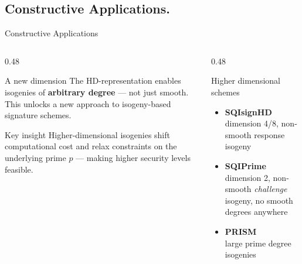 \documentclass[aspectratio=169,notheorems]{beamer}
\begin{document}
	\subsection{Constructive  Applications.}
		\begin{frame}{Constructive Applications}
		\begin{columns}[T]
			\begin{column}{0.48\textwidth}
				\begin{block}{A new dimension}
					The HD-representation enables isogenies
					of \textbf{arbitrary degree} — not just smooth.
					This unlocks a new approach to
					isogeny-based signature schemes.
				\end{block}
				\begin{exampleblock}{Key insight}
					Higher-dimensional isogenies shift
					computational cost and relax constraints
					on the underlying prime $p$ —
					making higher security levels feasible.
				\end{exampleblock}
			\end{column}
			\begin{column}{0.48\textwidth}
				\begin{block}{Higher dimensional schemes}
					\begin{itemize}
						\item \textbf{SQIsignHD \cite{dartoisSQIsignHDNewDimensions2024} }\\ dimension 4/8,
						non-smooth response isogeny
						\item \textbf{SQIPrime \cite{duparcSQIPrimeDimension22025}} \\ dimension 2,
						non-smooth \emph{challenge} isogeny,
						no smooth degrees anywhere
						\item \textbf{PRISM \cite{bassoPRISMSimpleCompact}} \\ large prime degree
						isogenies
					\end{itemize}
				\end{block}
			\end{column}
		\end{columns}
\end{frame}
\end{document}
